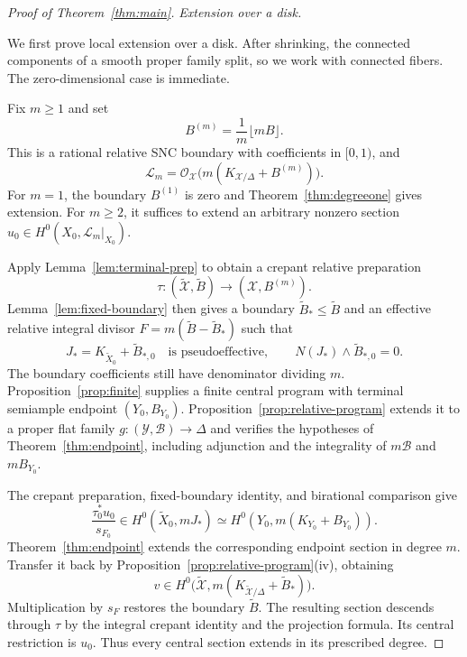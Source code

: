 \documentclass[11pt,a4paper]{article}
\numberwithin{equation}{section}
\theoremstyle{definition}
\theoremstyle{remark}
\newcommand{\OO}{\mathcal O}\newcommand{\cX}{\mathcal X}
\begin{document}
\begin{proof}[Proof of Theorem~\ref{thm:main}]
\emph{Extension over a disk.}

We first prove local extension over a disk. After shrinking, the
connected components of a smooth proper family split, so we work
with connected fibers. The zero-dimensional case is immediate.

Fix $m\ge1$ and set
\begin{equation}\label{eq:degree-rounding}
 B^{(m)}=\frac1m\lfloor mB\rfloor.
\end{equation}
This is a rational relative SNC boundary with coefficients in $[0,1)$,
and
\begin{equation}\label{eq:rounded-identity}
 \mathcal L_m=\OO_{\mathcal X}
       \bigl(m(K_{\mathcal X/\Delta}+B^{(m)})\bigr).
\end{equation}
For $m=1$, the boundary $B^{(1)}$ is zero and
Theorem~\ref{thm:degreeone} gives extension. For $m\ge2$,
it suffices to extend an arbitrary nonzero section
$u_0\in H^0(X_0,\mathcal L_m|_{X_0})$.

Apply Lemma~\ref{lem:terminal-prep} to obtain a crepant relative
preparation
\[
 \tau:(\widetilde{\mathcal X},\widetilde B)
       \longrightarrow(\mathcal X,B^{(m)}).
\]
Lemma~\ref{lem:fixed-boundary} then gives a boundary
$\widetilde B_*\le\widetilde B$ and an effective relative integral
divisor $F=m(\widetilde B-\widetilde B_*)$ such that
\[
 J_*=K_{\widetilde X_0}+\widetilde B_{*,0}
 \quad\text{is pseudoeffective},\qquad
 N(J_*)\wedge\widetilde B_{*,0}=0.
\]
The boundary coefficients still have denominator dividing $m$.
Proposition~\ref{prop:finite} supplies a finite central program with
terminal semiample endpoint $(Y_0,B_{Y_0})$.
Proposition~\ref{prop:relative-program} extends it to a proper flat
family $g:(\mathcal Y,\mathcal B)\to\Delta$ and verifies the
hypotheses of Theorem~\ref{thm:endpoint}, including adjunction and
the integrality of $m\mathcal B$ and $mB_{Y_0}$.

The crepant preparation, fixed-boundary identity, and
birational comparison give
\[
 \frac{\tau_0^*u_0}{s_{F_0}}
 \in H^0(\widetilde X_0,mJ_*)
 \simeq H^0(Y_0,m(K_{Y_0}+B_{Y_0})).
\]
Theorem~\ref{thm:endpoint} extends the corresponding endpoint
section in degree $m$. Transfer it back by
Proposition~\ref{prop:relative-program}(iv), obtaining
\[
 v\in H^0\bigl(\widetilde{\mathcal X},
       m(K_{\widetilde{\mathcal X}/\Delta}+\widetilde B_*)\bigr).
\]
Multiplication by $s_F$ restores the boundary $\widetilde B$.
The resulting section descends through $\tau$ by the integral
crepant identity and the projection formula. Its central restriction
is $u_0$. Thus every central section extends in its prescribed degree.


\end{proof}
\end{document}
